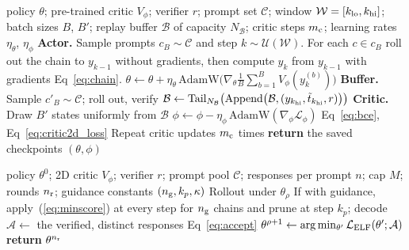 \noindent
\begin{minipage}[t]{0.49\textwidth}
\begin{algorithm}[H]
\caption{\method{} with a jointly trained SVG critic}
\label{alg:jpc}
\small
\begin{algorithmic}[1]
\REQUIRE policy $\theta$; pre-trained critic $V_\phi$; verifier $r$; prompt set $\mathcal C$; window $\mathcal W=[k_{\rm lo},k_{\rm hi}]$; batch sizes $B$, $B'$; replay buffer $\mathcal B$ of capacity $N_{\mathcal B}$; critic steps $m_{\rm c}$; learning rates $\eta_\theta$, $\eta_\phi$
  \STATE \textbf{Actor.} Sample prompts $c_B \sim \mathcal C$ and step $k\sim\mathcal U(\mathcal W)$. For each $c \in c_B$ roll out the chain to $y_{k-1}$ without gradients, then compute $y_k$ from $y_{k-1}$ with gradients Eq~\ref{eq:chain}.
  \STATE $\theta\leftarrow\theta+\eta_\theta\,\mathrm{AdamW}\Big(\nabla_\theta\frac1B\sum_{b=1}^{B}V_\phi(y_k^{(b)})\Big)$
  \STATE \textbf{Buffer.} Sample $c'_B \sim \mathcal C$; roll out, verify \STATE $\mathcal B \leftarrow \operatorname{Tail}_{N_{\mathcal B}}\!\left(\operatorname{Append}\!\left(\mathcal B,(y_{k_{\rm hi}},\tilde t_{k_{\rm hi}},r)\right)\right)$
  \STATE \textbf{Critic.} Draw $B'$ states uniformly from $\mathcal B$ 
  \STATE $\phi\leftarrow\phi-\eta_\phi\,\mathrm{AdamW}(\nabla_\phi\mathcal L_{\phi})$ Eq~\ref{eq:bce}, Eq~\ref{eq:critic2d_loss}
  \STATE Repeat critic updates $m_{\rm c}$ times
\ENDFOR
\STATE \textbf{return} the saved checkpoints $(\theta,\phi)$
\end{algorithmic}
\end{algorithm}
\end{minipage}\hfill
\begin{minipage}[t]{0.49\textwidth}
\begin{algorithm}[H]
\caption{Amortisation loop}
\label{alg:loop}
\small
\begin{algorithmic}[1]
\REQUIRE policy $\theta^0$; 2D critic $V_\phi$; verifier $r$; prompt pool $\mathcal C$; responses per prompt $n$; cap $M$; rounds $n_{\rm r}$; guidance constants $(n_{\rm g},k_p,\kappa)$
    \STATE Rollout under $\theta_\rho$
    \STATE If with guidance, apply~(\ref{eq:minscore}) at every step for $n_{\rm g}$ chains and prune at step $k_p$; decode 
  \ENDFOR
  \ENDFOR
  \STATE $\mathcal A\leftarrow$ the verified, distinct responses Eq~\ref{eq:accept}
  \STATE $\theta^{\rho+1}\leftarrow\arg\min_{\theta'}\mathcal L_{\rm ELF}(\theta';\mathcal A)$
\ENDFOR
\STATE \textbf{return} $\theta^{n_{\rm r}}$
\end{algorithmic}
\end{algorithm}
\end{minipage}
